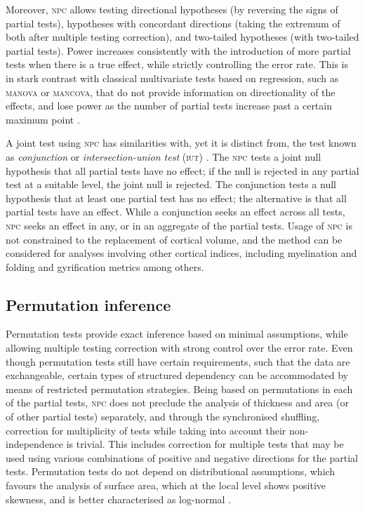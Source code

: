 Moreover, \textsc{npc} allows testing directional hypotheses (by reversing the signs of partial tests), hypotheses with concordant directions (taking the extremum of both after multiple testing correction), and two-tailed hypotheses (with two-tailed partial tests). Power increases consistently with the introduction of more partial tests when there is a true effect, while strictly controlling the error rate. This is in stark contrast with classical multivariate tests based on regression, such as \textsc{manova} or \textsc{mancova}, that do not provide information on directionality of the effects, and lose power as the number of partial tests increase past a certain maximum point \citep{Winkler2016_npc}.

A joint test using \textsc{npc} has similarities with, yet it is distinct from, the test known as \emph{conjunction} or \emph{intersection-union test} (\textsc{iut}) \citep{Nichols2005}. The \textsc{npc} tests a joint null hypothesis that all partial tests have no effect; if the null is rejected in any partial test at a suitable level, the joint null is rejected. The conjunction tests a null hypothesis that at least one partial test has no effect; the alternative is that all partial tests have an effect. While a conjunction seeks an effect across all tests, \textsc{npc} seeks an effect in any, or in an aggregate of the partial tests. Usage of \textsc{npc} is not constrained to the replacement of cortical volume, and the method can be considered for analyses involving other cortical indices, including myelination \citep{Glasser2011, Sereno2012} and folding and gyrification metrics \citep{Mangin2004, Schaer2008, Toro2008} among others.

\subsection{Permutation inference}

Permutation tests provide exact inference based on minimal assumptions, while allowing multiple testing correction with strong control over the error rate. Even though permutation tests still have certain requirements, such that the data are exchangeable, certain types of structured dependency can be accommodated by means of restricted permutation strategies. Being based on permutations in each of the partial tests, \textsc{npc} does not preclude the analysis of thickness and area (or of other partial tests) separately, and through the synchronised shuffling, correction for multiplicity of tests while taking into account their non-independence is trivial. This includes correction for multiple tests that may be used using various combinations of positive and negative directions for the partial tests. Permutation tests do not depend on distributional assumptions, which favours the analysis of surface area, which at the local level shows positive skewness, and is better characterised as log-normal \citep{Winkler2012}.  

